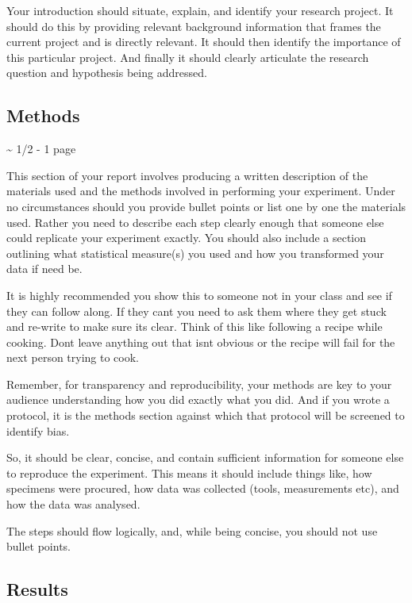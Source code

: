 \documentclass[
]{book}
\begin{document}
Your introduction should situate, explain, and identify your research project. It should do this by providing relevant background information that frames the current project and is directly relevant. It should then identify the importance of this particular project. And finally it should clearly articulate the research question and hypothesis being addressed.

\hypertarget{methods}{%
\subsection*{Methods}\label{methods}}

\textasciitilde{} 1/2 - 1 page

This section of your report involves producing a written description of the materials used and the methods involved in performing your experiment. Under no circumstances should you provide bullet points or list one by one the materials used. Rather you need to describe each step clearly enough that someone else could replicate your experiment exactly. You should also include a section outlining what statistical measure(s) you used and how you transformed your data if need be.

It is highly recommended you show this to someone not in your class and see if they can follow along. If they can\textquotesingle t you need to ask them where they get stuck and re-write to make sure it\textquotesingle s clear. Think of this like following a recipe while cooking. Don\textquotesingle t leave anything out that isn\textquotesingle t obvious or the recipe will fail for the next person trying to cook.

Remember, for transparency and reproducibility, your methods are key to your audience understanding how you did exactly what you did. And if you wrote a protocol, it is the methods section against which that protocol will be screened to identify bias.

So, it should be clear, concise, and contain sufficient information for someone else to reproduce the experiment. This means it should include things like, how specimens were procured, how data was collected (tools, measurements etc), and how the data was analysed.

The steps should flow logically, and, while being concise, you should not use bullet points.

\hypertarget{results}{%
\subsection*{Results}\label{results}}
\end{document}
